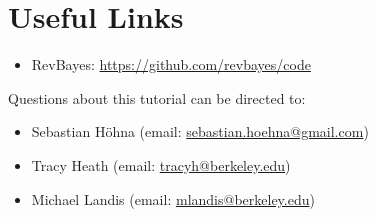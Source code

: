 \bigskip
\section*{Useful Links}

\begin{itemize}
\item RevBayes: \href{https://github.com/revbayes/code}{https://github.com/revbayes/code} \\ \vspace{-7mm}
\end{itemize}

Questions about this tutorial can be directed to: \\\vspace{-10mm}
\begin{itemize}
\item Sebastian H\"{o}hna (email: \href{mailto:sebastian.hoehna@gmail.com}{sebastian.hoehna@gmail.com}) \\\vspace{-8mm} 
\item Tracy Heath (email: \href{mailto:tracyh@berkeley.edu}{tracyh@berkeley.edu}) \\\vspace{-8mm}
\item Michael Landis (email: \href{mailto:mlandis@berkeley.edu}{mlandis@berkeley.edu})
\end{itemize}
